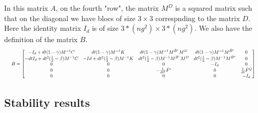 In this matrix $A$, on the fourth "row", the matrix $M^D$ is a squared matrix such that   
on the diagonal we have blocs of size  $3 \times 3$ correspnding to the matrix $D$. Here the identity matrix $I_d$ is of size $3*(ng^2) \times 3*(ng^2)$.
We also have the definition of the matrix $B$.
\begin{equation}
\resizebox{\columnwidth}{!}{
$
B = \begin{bmatrix}
-I_d + dt (1-\gamma) M^{-1} C & dt (1-\gamma) M^{-1} K & dt (1-\gamma) M^{-1} M^{\tilde{B}^{e}}M^D & dt (1-\gamma) M^{-1} M^{\tilde{B}^{p}} & 0  \\

 - dt I_d + dt^2 (\frac{1}{2} - \beta) M^{-1} C & - Id + dt^2 (\frac{1}{2} - \beta) M^{-1}K & dt^2 (\frac{1}{2} - \beta) M^{-1}M^{\tilde{B}^{e}}M^D  & dt^2 (\frac{1}{2} - \beta) M^{-1} M^{\tilde{B}^{p}} & 0  \\

0 & 0 & 0 & -I_d & 0 \\
0 & 0 & -\frac{1}{dt^2}\hat{F}^\epsilon & 0 &  \frac{1}{dt} \hat{F}^Q \\
0 & 0 & 0 & 0 & -I_d 
\end{bmatrix}
$
}
\label{eq:B}
\end{equation}

\subsection{Stability results}

